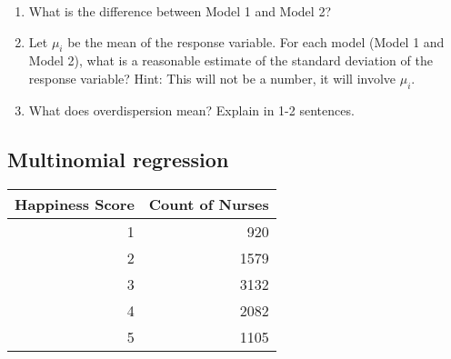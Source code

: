 \documentclass[11pt]{article}
\begin{document}
\begin{enumerate}
\item What is the difference between Model 1 and Model 2? 


\vspace{4cm} 


\item Let $\mu_i$ be the mean of the response variable. For each model (Model  1 and Model 2), what is a reasonable estimate of the standard deviation of the response variable? Hint: This will not be a number, it will involve $\mu_i$. 


\pagebreak



\item What does overdispersion mean? Explain in 1-2 sentences. 

\vspace{4cm}

\end{enumerate}

\subsection{Multinomial regression}

\begin{table}[ht]
\centering
\begin{tabular}{rr}
  \hline
 Happiness Score & Count of Nurses  \\ 
  \hline
  1 & 920 \\ 
  2 & 1579 \\ 
  3 & 3132 \\ 
  4 & 2082 \\ 
  5 & 1105 \\ 
   \hline
\end{tabular}
\end{table}
\end{document}
